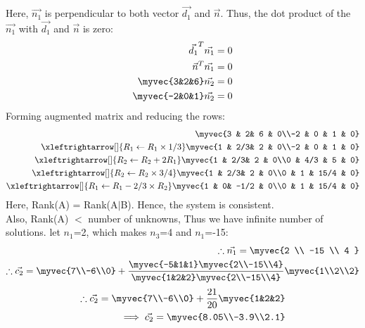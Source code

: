 \documentclass[journal,12pt,twocolumn]{IEEEtran}
\begin{document}
Here, $\Vec{n_1}$ is perpendicular to both vector $\Vec{d_1}$ and $\Vec{n}$. Thus, the dot product of the $\Vec{n_1}$ with $\Vec{d_1}$ and $\Vec{n}$ is zero:
\begin{align}
    \vec{d_1}^T\vec{n_1} =  0\\
    \vec{n}^T\vec{n_1} =  0\\
    \myvec{3&2&6}\vec{n_2}=0\\
    \myvec{-2&0&1}\vec{n_2}=0
\end{align}
Forming augmented matrix and reducing the rows:
\begin{align}
\myvec{3 & 2& 6 & 0\\-2 & 0 & 1 & 0}\\
\xleftrightarrow[]{R_1\leftarrow R_1\times1/3}
\myvec{1 & 2/3& 2 & 0\\-2 & 0 & 1 & 0}\\
\xleftrightarrow[]{R_2\leftarrow R_2+2R_1}
\myvec{1 & 2/3& 2 & 0\\0 & 4/3 & 5 & 0}\\
\xleftrightarrow[]{R_2\leftarrow R_2\times 3/4}
\myvec{1 & 2/3& 2 & 0\\0 & 1 & 15/4 & 0}\\
\xleftrightarrow[]{R_1\leftarrow R_1-2/3\times R_2}
\myvec{1 & 0& -1/2 & 0\\0 & 1 & 15/4 & 0}\\
\end{align} 
Here, Rank(A) = Rank(A$\mid$B). Hence, the system is consistent. 
\\
Also, Rank(A) $<$ number of unknowns, Thus we have infinite number of solutions. let $n_1$=2, which makes $n_3$=4 and $n_1$=-15:
\begin{align}
\therefore \vec{n_1}=\myvec{2 \\ -15 \\ 4 }\\
\therefore \vec{c_2}= \myvec{7\\-6\\0}+\frac{\myvec{-5&1&1} \myvec{2\\-15\\4}}{\myvec{1&2&2} \myvec{2\\-15\\4}}\myvec{1\\2\\2}
\end{align}
\begin{align}
\therefore \vec{c_2}= \myvec{7\\-6\\0}+\frac{21}{20}\myvec{1&2&2}\\
\implies \vec{c_2}=\myvec{8.05\\-3.9\\2.1}
\end{align}
\end{document}
